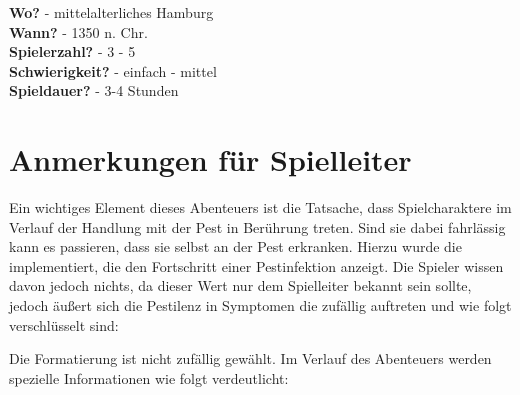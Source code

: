 
\textbf{Wo?}            -  mittelalterliches Hamburg \\
\textbf{Wann?}          -  1350 n. Chr. \\
\textbf{Spielerzahl?}   -  3 - 5 \\
\textbf{Schwierigkeit?} -  einfach - mittel \\
\textbf{Spieldauer?}    -  3-4 Stunden

\section{Anmerkungen für Spielleiter}

Ein wichtiges Element dieses Abenteuers ist die Tatsache, dass Spielcharaktere im Verlauf der Handlung mit der Pest in Berührung treten. Sind sie dabei fahrlässig kann es passieren, dass sie selbst an der Pest erkranken. Hierzu wurde die  implementiert, die den Fortschritt einer Pestinfektion anzeigt. Die Spieler wissen davon jedoch nichts, da dieser Wert nur dem Spielleiter bekannt sein sollte, jedoch äußert sich die Pestilenz in Symptomen die zufällig auftreten und wie folgt verschlüsselt sind:



Die Formatierung ist nicht zufällig gewählt. Im Verlauf des Abenteuers werden spezielle Informationen wie folgt verdeutlicht:

